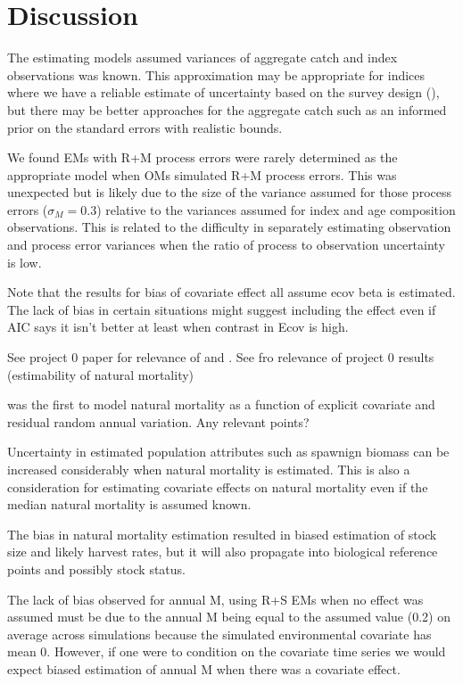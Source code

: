\documentclass[
  12pt,
]{article}
\begin{document}
\hypertarget{discussion}{%
\section*{Discussion}\label{discussion}}

The estimating models assumed variances of aggregate catch and index observations was known. This approximation may be appropriate for indices where we have a reliable estimate of uncertainty based on the survey design (), but there may be better approaches for the aggregate catch such as an informed prior on the standard errors with realistic bounds.

We found EMs with R+M process errors were rarely determined as the appropriate model when OMs simulated R+M process errors. This was unexpected but is likely due to the size of the variance assumed for those process errors (\(\sigma_M = 0.3\)) relative to the variances assumed for index and age composition observations. This is related to the difficulty in separately estimating observation and process error variances when the ratio of process to observation uncertainty is low.

Note that the results for bias of covariate effect all assume ecov beta is estimated. The lack of bias in certain situations might suggest including the effect even if AIC says it isn't better at least when contrast in Ecov is high.

See project 0 paper for relevance of \citet{lietal24} and \citet{liljestrandetal24}. See \citet{milleretal_inreview1} fro relevance of project 0 results (estimability of natural mortality)

\citet{derisoetal08} was the first to model natural mortality as a function of explicit covariate and residual random annual variation. Any relevant points?

Uncertainty in estimated population attributes such as spawnign biomass can be increased considerably when natural mortality is estimated. This is also a consideration for estimating covariate effects on natural mortality even if the median natural mortality is assumed known.

The bias in natural mortality estimation resulted in biased estimation of stock size and likely harvest rates, but it will also propagate into biological reference points and possibly stock status.

The lack of bias observed for annual M, using R+S EMs when no effect was assumed must be due to the annual M being equal to the assumed value (0.2) on average across simulations because the simulated environmental covariate has mean 0. However, if one were to condition on the covariate time series we would expect biased estimation of annual M when there was a covariate effect.
\end{document}
